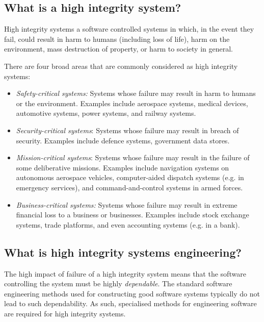 \subsection*{What is a high integrity system?}

High integrity systems a software controlled systems in which, in the event they fail, could result in harm to humans (including loss of life), harm on the environment, mass destruction of property, or harm to society in general.

There are four broad areas that are commonly considered as high integrity systems:

\begin{itemize}

 \item \emph{Safety-critical systems:} Systems whose failure may result in harm to humans or the environment.  Examples include aerospace systems, medical devices, automotive systems, power systems, and railway systems.

 \item \emph{Security-critical systems}: Systems whose failure may result in breach of security. Examples include defence systems, government data stores.

 \item \emph{Mission-critical systems}: Systems whose failure may result in the failure of some deliberative missions. Examples include navigation systems on autonomous aerospace vehicles, computer-aided dispatch systems (e.g. in emergency services), and  command-and-control systems in armed forces.

  \item \emph{Business-critical systems:} Systems whose failure may result in extreme financial loss to a business or businesses. Examples include stock exchange systems, trade platforms, and even accounting systems (e.g. in a bank).

\end{itemize}


\subsection*{What is high integrity systems engineering?}

The high impact of failure of a high integrity system means that the software controlling the system must be highly \emph{dependable}. The standard software engineering methods used for constructing good software systems typically do not lead to such dependability. As such, specialised methods for engineering software are required for high integrity systems.


